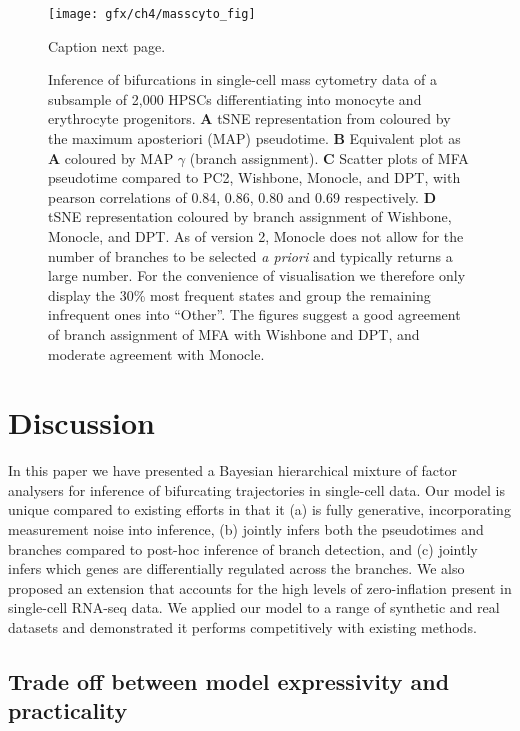 \begin{figure}
	\centering
	\texttt{[image: gfx/ch4/masscyto\_fig]}
	\caption{Caption next page.} \label{fig:masscyto}
\end{figure}
\addtocounter{figure}{-1}
\begin{figure}
	\caption{Inference of bifurcations in single-cell mass cytometry data of a subsample of 2,000 HPSCs differentiating into monocyte and erythrocyte progenitors.
	\textbf{A} tSNE representation from \cite{setty2016wishbone} coloured by the maximum aposteriori (MAP) pseudotime.
	\textbf{B} Equivalent plot as \textbf{A} coloured by MAP $\gamma$ (branch assignment).
	\textbf{C} Scatter plots of MFA pseudotime compared to PC2, Wishbone, Monocle, and DPT, with pearson correlations of 0.84, 0.86, 0.80 and 0.69 respectively.
	\textbf{D} tSNE representation coloured by branch assignment of Wishbone, Monocle, and DPT. As of version 2, Monocle does not allow for the number of branches to be selected \emph{a priori} and typically returns a large number. For the convenience of visualisation we therefore only display the 30\% most frequent states and group the remaining infrequent ones into ``Other''. The figures suggest a good agreement of branch assignment of MFA with Wishbone and DPT, and moderate agreement with Monocle.
	}
\end{figure}



\section{Discussion}

In this paper we have presented a Bayesian hierarchical mixture of factor analysers for inference of bifurcating trajectories in single-cell data. Our model is unique compared to existing efforts in that it (a) is fully generative, incorporating measurement noise into inference, (b) jointly infers both the pseudotimes and branches compared to post-hoc inference of branch detection, and (c) jointly infers which genes are differentially regulated across the branches. We also proposed an extension that accounts for the high levels of zero-inflation present in single-cell RNA-seq data. We applied our model to a range of synthetic and real datasets and demonstrated it  performs competitively with existing methods.

\subsection{Trade off between model expressivity and practicality}


